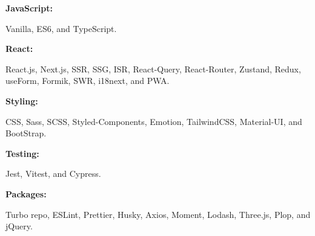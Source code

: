 \documentclass[8pt]{developercv} %
\begin{document}
    \begin{minipage}[t]{0.47\textwidth}
        \vspace{-6pt}

        \begin{minipage}[t]{0.2\textwidth}
            \textbf{JavaScript:}
        \end{minipage}
        \hfill
        \begin{minipage}[t]{0.73\textwidth}
            Vanilla, ES6, and TypeScript.
        \end{minipage}
        \vspace{4pt}

        \begin{minipage}[t]{0.2\textwidth}
            \textbf{React:}
        \end{minipage}
        \hfill
        \begin{minipage}[t]{0.73\textwidth}
            React.js, Next.js, SSR, SSG, ISR, React-Query, React-Router, Zustand, Redux, useForm, Formik, SWR, i18next, and PWA\@.
        \end{minipage}
        \vspace{4pt}

        \begin{minipage}[t]{0.2\textwidth}
            \textbf{Styling:}
        \end{minipage}
        \hfill
        \begin{minipage}[t]{0.73\textwidth}
            CSS, Sass, SCSS, Styled-Components, Emotion, TailwindCSS, Material-UI, and BootStrap.
        \end{minipage}
        \vspace{4pt}

        \begin{minipage}[t]{0.2\textwidth}
            \textbf{Testing:}
        \end{minipage}
        \hfill
        \begin{minipage}[t]{0.73\textwidth}
            Jest, Vitest, and Cypress.
        \end{minipage}
        \vspace{4pt}

        \begin{minipage}[t]{0.2\textwidth}
            \textbf{Packages:}
        \end{minipage}
        \hfill
        \begin{minipage}[t]{0.73\textwidth}
            Turbo repo, ESLint, Prettier, Husky, Axios, Moment, Lodash, Three.js, Plop, and jQuery.
        \end{minipage}
        \vspace{4pt}


\end{minipage}
\end{document}
